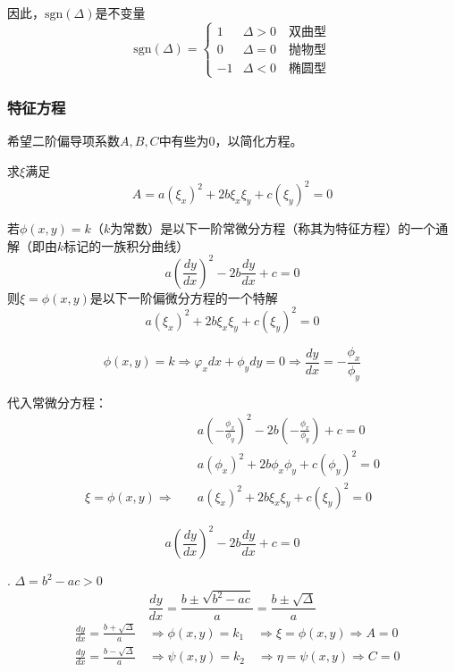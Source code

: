 因此，$\boxed{\mathrm{sgn}(\Delta)\text{是不变量}}$
    $$\mathrm{sgn}(\Delta)=
    \begin{cases}
        1&\Delta>0\quad \text{双曲型}\\
        0&\Delta=0\quad \text{抛物型}\\
        -1&\Delta<0\quad \text{椭圆型}
    \end{cases}$$

\subsubsection{特征方程}
希望二阶偏导项系数$A,B,C$中有些为0，以简化方程。

求$\xi$满足
$$A=a(\xi_x)^{2}+2b\xi_x\xi_y+c(\xi_y)^{2}=0$$

\begin{thm}
    若$\phi(x,y)=k$（$k$为常数）是以下一阶常微分方程（称其为特征方程）的一个通解（即由$k$标记的一族积分曲线）
    $$a(\frac{dy}{dx})^2-2b\frac{dy}{dx}+c=0$$
    则$\xi=\phi(x,y)$是以下一阶偏微分方程的一个特解
    $$a(\xi_x)^{2}+2b\xi_x\xi_y+c(\xi_y)^{2}=0$$
\end{thm}
\begin{prf}
    $$\phi(x,y)=k\Rightarrow\varphi_{x}dx+\phi_{y}dy=0\Rightarrow\frac{dy}{dx}=-\frac{\phi_{x}}{\phi_y}$$

    代入常微分方程：
    $$\begin{aligned}
        &a(-\frac{\phi_{x}}{\phi_y})^{2}-2b(-\frac{\phi_{x}}{\phi_y})+c=0\\
        &a(\phi_x)^2+2b\phi_x\phi_y+c(\phi_y)^2=0\\
        \xi=\phi(x,y)\Rightarrow\quad &a(\xi_x)^2+2b\xi _x\xi_y+c(\xi_y)^2=0
        \end{aligned}$$
\end{prf}

\begin{dfn}[特征方程]
    $$\boxed{a(\frac{dy}{dx})^2-2b\frac{dy}{dx}+c=0}$$
\end{dfn}
. $\Delta=b^2-ac>0$
$$\frac{dy}{dx}=\frac{b\pm\sqrt{b^{2}-ac}}{a}=\frac{b\pm\sqrt{\Delta}}{a}$$
$$\begin{aligned}
    &\frac{dy}{dx}=\frac{b+\sqrt{\Delta}}{a}\quad\Rightarrow\phi(x,y)=k_{1}\quad\Rightarrow\xi=\phi(x,y)\Rightarrow A=0\\
    &\frac{dy}{dx}=\frac{b-\sqrt{\Delta}}{a}\quad\Rightarrow\psi(x,y)=k_{2}\quad\Rightarrow\eta=\psi(x,y)\Rightarrow C=0
\end{aligned}$$

